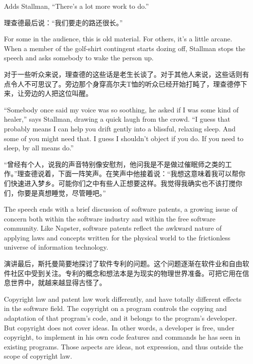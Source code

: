 \ifdefined\eng
Adds Stallman, ``There's a lot more work to do.''
\fi

\ifdefined\chs
理查德最后说：``我们要走的路还很长。''
\fi

\ifdefined\eng
For some in the audience, this is old material. For others, it's a little arcane. When a member of the golf-shirt contingent starts dozing off, Stallman stops the speech and asks somebody to wake the person up.
\fi

\ifdefined\chs
对于一些听众来说，理查德的这些话是老生长谈了。对于其他人来说，这些话则有点令人不可思议了。旁边那个身穿高尔夫T恤的听众已经开始打盹了，理查德停下来，让旁边的人把这位叫醒。
\fi

\ifdefined\eng
``Somebody once said my voice was so soothing, he asked if I was some kind of healer,'' says Stallman, drawing a quick laugh from the crowd. ``I guess that probably means I can help you drift gently into a blissful, relaxing sleep. And some of you might need that. I guess I shouldn't object if you do. If you need to sleep, by all means do.''
\fi

\ifdefined\chs
``曾经有个人，说我的声音特别像安慰剂，他问我是不是做过催眠师之类的工作。''理查德说着，下面一阵笑声。在笑声中他接着说：``我想这意味着我可以帮你们快速进入梦乡。可能你们之中有些人正想要这样。我觉得我确实也不该打搅你们，你要是真想睡觉，尽管睡吧。''
\fi

\ifdefined\eng
The speech ends with a brief discussion of software patents, a growing issue of concern both within the software industry and within the free software community. Like Napster, software patents reflect the awkward nature of applying laws and concepts written for the physical world to the frictionless universe of information technology.
\fi

\ifdefined\chs
演讲最后，斯托曼简要地探讨了软件专利的问题。这个问题逐渐在软件业和自由软件社区中受到关注。专利的概念和想法本是为现实的物理世界准备。可把它用在信息世界中，就越来越显得古怪了。
\fi

\ifdefined\eng
Copyright law and patent law work differently, and have totally different effects in the software field.  The copyright on a program controls the copying and adaptation of that program's code, and it belongs to the program's developer.  But copyright does not cover ideas. In other words, a developer is free, under copyright, to implement in his own code features and commands he has seen in existing programs.  Those aspects are ideas, not expression, and thus outside the scope of copyright law.
\fi

